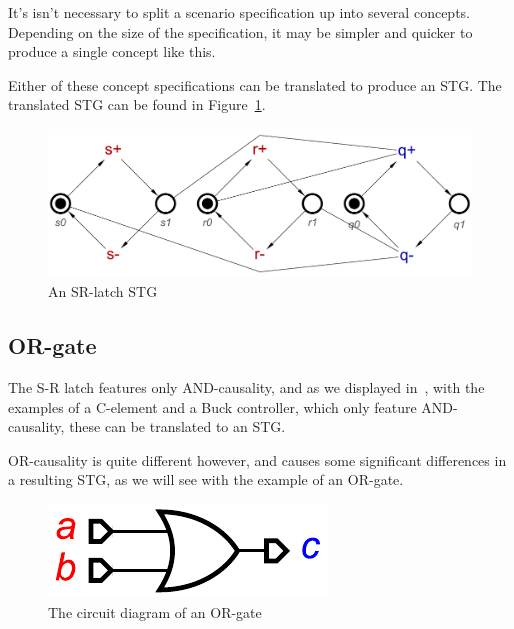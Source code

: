 \documentclass[british,conference,compsoc]{IEEEtran}
\begin{document}
\noindent It's isn't necessary to split a scenario specification up into several concepts. 
Depending on the size of the specification, it may be simpler and quicker to 
produce a single concept like this.

Either of these concept specifications can be translated to produce an STG. 
The translated STG can be found in Figure~\ref{fig:sr-latch-stg}.


\begin{figure}[h]
\begin{centering}
\includegraphics[scale=0.25]{Images/sr-latch-stg}
\par\end{centering}
\protect\caption{\label{fig:sr-latch-stg} An SR-latch STG}
\end{figure}

\subsection{OR-gate \label{sub:or-gate}}

The S-R latch features only AND-causality, and as we displayed 
in~\cite{2015_Beaumont_MEMOCODE}, with the examples of a C-element 
and a Buck controller, which only feature AND-causality, these can be translated
to an STG. 

OR-causality is quite different however, and causes some significant differences 
in a resulting STG, as we will see with the example of an OR-gate. 

\begin{figure}[h]
\begin{centering}
\includegraphics[scale=0.55]{Images/or-gate-circuit}
\par\end{centering}

\protect\caption{\label{fig:or-gate-circuit} The circuit diagram of an OR-gate}
\end{figure}
\end{document}
